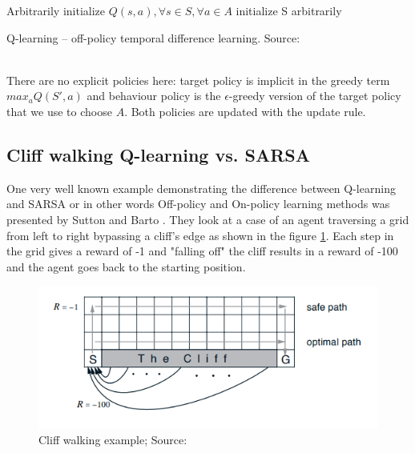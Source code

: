 \begin{algorithm}[H]
\SetAlgoLined
Arbitrarily initialize $Q(s, a), \forall s \in S, \forall a \in A$\;
initialize S arbitrarily\;
\caption{Q-learning -- off-policy temporal difference learning. Source: \cite{lecture_mfc} }
\end{algorithm}\\


There are no explicit policies here: target policy is implicit in the greedy term $max_a Q(S', a)$ and behaviour policy is the $\epsilon$-greedy version of the target policy that we use to choose $A$. Both policies are updated with the update rule.

\subsection{Cliff walking  Q-learning vs. SARSA}
One very well known example demonstrating the difference between
Q-learning and SARSA or in other words Off-policy and On-policy learning methods was presented by Sutton and Barto \cite{sutton_barto}. They look at a case of an agent traversing a grid from left to right bypassing a cliff's edge as shown in the figure \ref{fig:cliff}. Each
step in the grid gives a reward of -1 and "falling off" 
the cliff results in a reward of -100 and the agent goes
back to the starting position.

\begin{figure}[H]
\centering
\includegraphics[scale=0.6]{figures/cliff_scheme.PNG}
  \caption{Cliff walking example; Source: \cite{sutton_barto}}
  \label{fig:cliff}
\end{figure}

